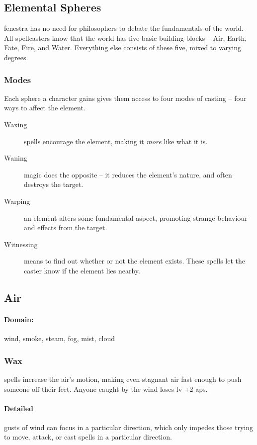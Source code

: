 \begin{multicols}{2}

\subsection{Elemental Spheres}

\Gls{fenestra} has no need for philosophers to debate the fundamentals of the world.
All spellcasters know that the world has five basic building-blocks -- Air, Earth, Fate, Fire, and Water.
Everything else consists of these five, mixed to varying degrees.

\subsubsection{Modes}
Each sphere a character gains gives them access to four modes of casting -- four ways to affect the element.

\begin{description}
  \item[Waxing]
  spells encourage the element, making it \emph{more} like what it is.
  \item[Waning]
  magic does the opposite -- it reduces the element's nature, and often destroys the target.
  \item[Warping]
  an element alters some fundamental aspect, promoting strange behaviour and effects from the target.
  \item[Witnessing]
  means to find out whether or not the element exists.
  These spells let the caster know if the element lies nearby.
\end{description}

\subsection{Air}
\paragraph{Domain:}
wind, smoke, steam, fog, mist, cloud

\subsubsection{Wax}
spells increase the air's motion, making even stagnant air fast enough to push someone off their feet.
Anyone caught by the wind loses \gls{lv} +2 \glspl{ap}.

\paragraph{Detailed}
gusts of wind can focus in a particular direction, which only impedes those trying to move, attack, or cast spells in a particular direction.


\end{multicols}
